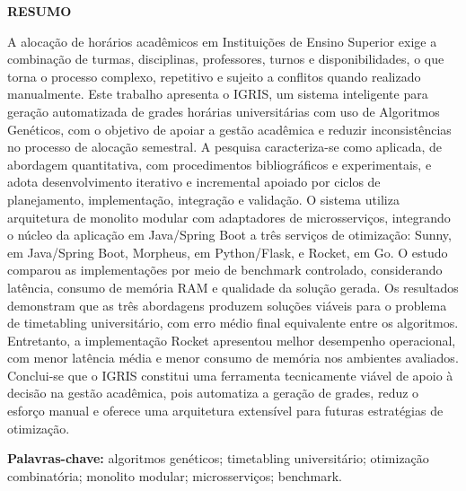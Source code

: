 ﻿%
\newpage
\begin{center}
  \textbf{RESUMO}
\end{center}

\vspace{1cm}

\setlength{\parindent}{0pt}
A alocação de horários acadêmicos em Instituições de Ensino Superior exige a combinação de turmas, disciplinas, professores, turnos e disponibilidades, o que torna o processo complexo, repetitivo e sujeito a conflitos quando realizado manualmente. Este trabalho apresenta o IGRIS, um sistema inteligente para geração automatizada de grades horárias universitárias com uso de Algoritmos Genéticos, com o objetivo de apoiar a gestão acadêmica e reduzir inconsistências no processo de alocação semestral. A pesquisa caracteriza-se como aplicada, de abordagem quantitativa, com procedimentos bibliográficos e experimentais, e adota desenvolvimento iterativo e incremental apoiado por ciclos de planejamento, implementação, integração e validação. O sistema utiliza arquitetura de monolito modular com adaptadores de microsserviços, integrando o núcleo da aplicação em Java/Spring Boot a três serviços de otimização: Sunny, em Java/Spring Boot, Morpheus, em Python/Flask, e Rocket, em Go. O estudo comparou as implementações por meio de benchmark controlado, considerando latência, consumo de memória RAM e qualidade da solução gerada. Os resultados demonstram que as três abordagens produzem soluções viáveis para o problema de timetabling universitário, com erro médio final equivalente entre os algoritmos. Entretanto, a implementação Rocket apresentou melhor desempenho operacional, com menor latência média e menor consumo de memória nos ambientes avaliados. Conclui-se que o IGRIS constitui uma ferramenta tecnicamente viável de apoio à decisão na gestão acadêmica, pois automatiza a geração de grades, reduz o esforço manual e oferece uma arquitetura extensível para futuras estratégias de otimização.
\vspace{0.5cm}

\noindent\textbf{Palavras-chave:} algoritmos genéticos; timetabling universitário; otimização combinatória; monolito modular; microsserviços; benchmark.
\setlength{\parindent}{1.25cm}
